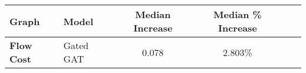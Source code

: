 \begin{tabular}{llcccc}
\toprule
\textbf{Graph} & \textbf{Model} & \textbf{Median Increase} & \textbf{Median \% Increase}\\
\midrule
\textbf{Flow Cost} & Gated GAT & 0.078 & 2.803\%\\
\bottomrule
\end{tabular}